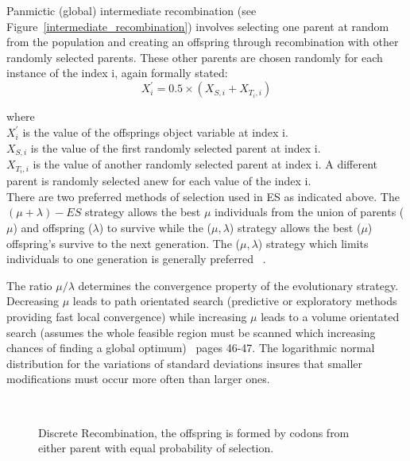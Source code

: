 Panmictic (global) intermediate recombination  (see Figure~\ref{intermediate_recombination}) involves selecting one parent at random from the population and creating an offspring through recombination with other randomly selected parents. These other parents are chosen randomly for each instance of the index i, again formally stated: \\

\begin{displaymath}
X^{'}_i = 0.5 \times (X_{S,i} + X_{T_i,i}) 
\end{displaymath}

where \\
$X^{'}_i$ is the value of the offsprings object variable at index i. \\
$X_{S,i}$ is the value of the first randomly selected parent at index i. \\
$X_{T_i,i}$ is the value of another randomly selected parent at index i. A different parent is randomly selected anew for each value of the index i. \\

\label{es_selection_strategies}There are two preferred methods of selection used in ES as indicated above. The $(\mu + \lambda)-ES$ strategy allows the best $\mu$ individuals from the union of parents ($\mu$) and offspring ($\lambda$) to survive while the ($\mu,\lambda$) strategy allows the best ($\mu$) offspring's survive to the next generation. The  ($\mu,\lambda$) strategy which limits individuals to one generation is generally preferred ~\cite{back}.

The ratio $\mu/\lambda$ determines the convergence property of the evolutionary strategy. Decreasing $\mu$ leads to path orientated search (predictive or exploratory methods providing fast local convergence) while increasing $\mu$ leads to a volume orientated search (assumes the whole feasible region must be scanned which increasing chances of finding a global optimum)~\cite{back} pages 46-47. The logarithmic normal distribution for the variations of standard deviations insures that smaller modifications must occur more often than larger ones. 


\begin{figure}[]
\centerline{\hbox{
}}
\caption[Discrete Recombination]{Discrete Recombination, the offspring is formed by codons from either parent with equal probability of selection.}
\label{discrete_recombination}
\end{figure}



